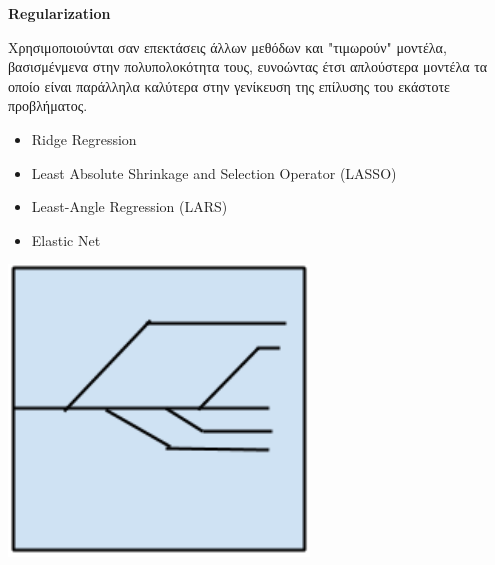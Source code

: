 \begin{minipage}{0.5\textwidth}  %

  \textbf{\large Regularization}

  Χρησιμοποιούνται σαν επεκτάσεις άλλων μεθόδων και
  "τιμωρούν" μοντέλα, βασισμένμενα στην πολυπολοκότητα τους, ευνοώντας έτσι
  απλούστερα μοντέλα τα οποίο είναι παράλληλα καλύτερα στην γενίκευση της
  επίλυσης του εκάστοτε προβλήματος.
  \begin{itemize}
    \setlength\itemsep{0em}
    \item{Ridge Regression}
    \item{Least Absolute Shrinkage and Selection Operator (LASSO)}
    \item{Least-Angle Regression (LARS)}
    \item{Elastic Net}
  \end{itemize}
\end{minipage}
\begin{minipage}{0.5\textwidth}
  \begin{center}
    \includegraphics[width=0.6\textwidth]{./images/chapter3/regularization_algorithms.png}
  \end{center}
\end{minipage}

